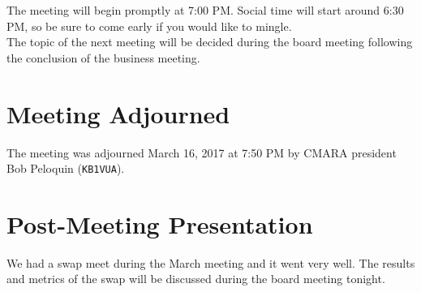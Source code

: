 \documentclass[10pt,letterpaper]{article}
\begin{document}
\noindent
The meeting will begin promptly at 7:00 PM. Social time will start around 6:30 PM, so be sure to come early if you would like to mingle.\\

\noindent
The topic of the next meeting will be decided during the board meeting following the conclusion of the business meeting.

\section{Meeting Adjourned}
The meeting was adjourned March 16, 2017 at 7:50 PM by CMARA president Bob Peloquin (\texttt{KB1VUA}).

\section{Post-Meeting Presentation}

We had a swap meet during the March meeting and it went very well. The results and metrics of the swap will be discussed during the board meeting tonight.
\end{document}
